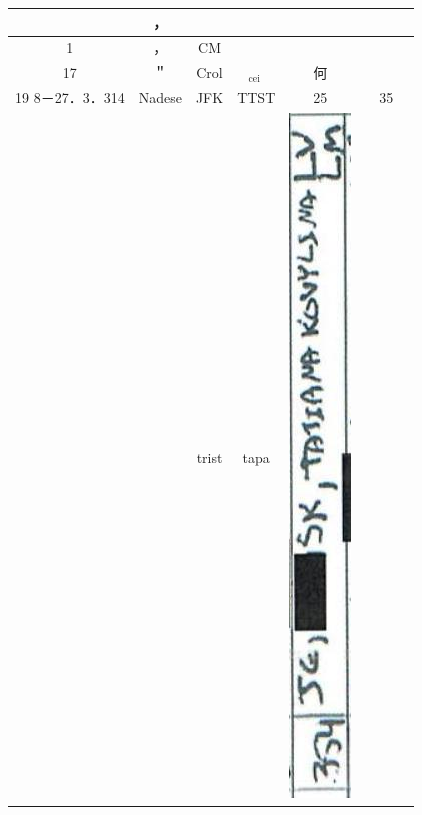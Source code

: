\documentclass[10pt]{article}
\begin{document}
\begin{center}
\begin{tabular}{|c|c|c|c|c|c|c|c|}
 & ， &  &  \\
\hline
1 & ， & CM &  &  &  &  &  \\
\hline
17 & ＂ & Crol & \({ }_{\text {cei }}\) & 何 &  &  &  \\
\hline
19 8－27．3．314 & Nadese & JFK & TTST & 25 &  & 35 &  \\
\hline
 &  & trist & tapa & \includegraphics[max width=\textwidth]{2025_02_27_dd68c3d38de88f0516d9g-122}

\end{tabular}
\end{center}
\end{document}
